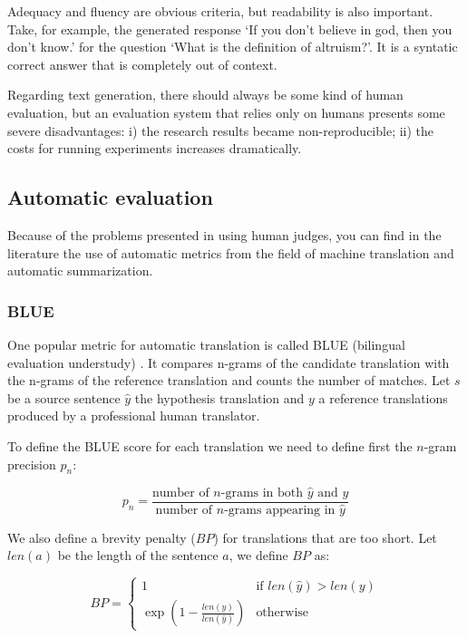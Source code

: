Adequacy and fluency are obvious criteria, but readability is also important. Take, for example, the generated response `If you don’t believe in god, then you don’t know.' for the question `What is the definition of altruism?'. It is a syntatic correct answer that is completely out of context.

Regarding text generation, there should always be some kind of human evaluation, but an evaluation system that relies only on humans presents some severe disadvantages: i) the research results became non-reproducible; ii) the costs for running experiments increases dramatically.

\subsection{Automatic evaluation}


Because of the problems presented in using human judges, you can find in the literature the use of automatic metrics from the field of machine translation and automatic summarization.

\subsubsection{BLUE}

One popular metric for automatic translation is called BLUE (bilingual evaluation understudy) \cite{Papineni2001}. It compares n-grams of the candidate translation with the n-grams of the reference translation and counts the number of matches. Let $s$ be a source sentence $\hat{y}$ the hypothesis translation and $y$ a reference translations produced by a professional human translator. 

To define the BLUE score for each translation we need to define first the $n$-gram precision $p_n$:

\begin{equation*}
p_n = \frac{\text{number of } n\text{-grams in both } \hat{y} \text{ and } y}{\text{number of } n\text{-grams appearing in } \hat{y}}
\end{equation*}    

We also define a brevity penalty ($BP$) for translations that are too short. Let $len(a)$ be the length of the sentence $a$, we define $BP$ as:

\begin{equation*}
BP=
\begin{cases}
1 & \text{if } len(\hat{y}) > len(y) \\
\exp\left( 1 - \frac{len(y)}{len(\hat{y})} \right) & \text{otherwise}
\end{cases}
\end{equation*} 


